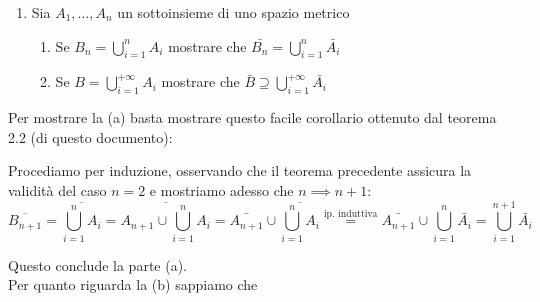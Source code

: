 \documentclass{report}
\begin{document}
\begin{enumerate}[resume, label=\protect\circled{\arabic*}]
	\item Sia $A_1, \ldots, A_n$ un sottoinsieme di uno spazio metrico
	\begin{enumerate}
		\item Se $B_n = \bigcup\limits_{i=1}^n A_i$ mostrare che $\bar{B_n} = \bigcup\limits_{i=1}^n \bar{A_i}$
		\item Se $B = \bigcup\limits_{i=1}^{+\infty} A_i$ mostrare che $\bar{B} \supseteq \bigcup\limits_{i=1}^{+\infty} \bar{A_i}$
	\end{enumerate}
\end{enumerate}
\begin{mysolution}
	Per mostrare la (a) basta mostrare questo facile corollario ottenuto dal teorema 2.2 (di questo documento):
\begin{myproof}
	Procediamo per induzione, osservando che il teorema precedente  assicura la validità del caso $n=2$ e mostriamo adesso che $n \implies n+1$:
	$$
		\overline{B_{n+1}} = \overline{\bigcup_{i=1}^n A_i} = \overline{A_{n+1} \cup \bigcup_{i=1}^n A_i} = \bar{A_{n+1}} \cup \overline{\bigcup_{i=1}^n A_i} \stackrel{\text{ip. induttiva}}{=} \bar{A_{n+1}} \cup \bigcup_{i=1}^{n} \bar{A_i} = \bigcup_{i=1}^{n+1} \bar{A_i}
	$$
\end{myproof}
\noindent Questo conclude la parte (a). \\
Per quanto riguarda la (b) sappiamo che 
\end{mysolution}
\end{document}
